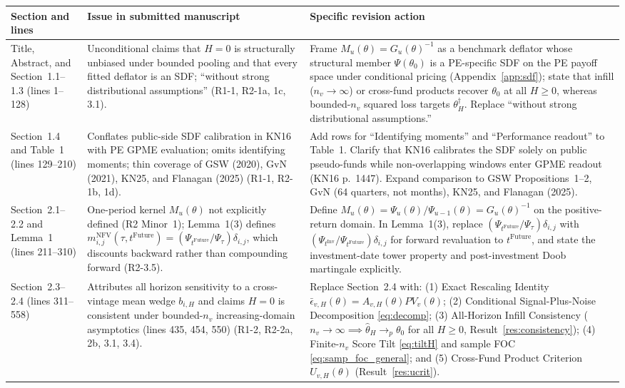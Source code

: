 \documentclass[11pt]{article}
\theoremstyle{plain}
\theoremstyle{definition}
\begin{document}
{\small
\begin{longtable}{@{}L{3.5cm}L{4.8cm}L{7.0cm}@{}}
\toprule
Section and lines & Issue in submitted manuscript & Specific revision action\\
\midrule
\endhead
Title, Abstract, and Section~1.1--1.3 (lines 1--128) & Unconditional claims that $H=0$ is structurally unbiased under bounded pooling and that every fitted deflator is an SDF; ``without strong distributional assumptions'' (R1-1, R2-1a, 1c, 3.1). & Frame $M_u(\theta)=G_u(\theta)^{-1}$ as a benchmark deflator whose structural member $\Psi(\theta_0)$ is a PE-specific SDF on the PE payoff space under conditional pricing (Appendix~\ref{app:sdf}); state that infill ($n_v\to\infty$) or cross-fund products recover $\theta_0$ at all $H\ge 0$, whereas bounded-$n_v$ squared loss targets $\theta_H^\dagger$. Replace ``without strong distributional assumptions.''\\
Section~1.4 and Table~1 (lines 129--210) & Conflates public-side SDF calibration in KN16 with PE GPME evaluation; omits identifying moments; thin coverage of GSW (2020), GvN (2021), KN25, and Flanagan (2025) (R1-1, R2-1b, 1d). & Add rows for ``Identifying moments'' and ``Performance readout'' to Table~1. Clarify that KN16 calibrates the SDF solely on public pseudo-funds while non-overlapping windows enter GPME readout (KN16 p.~1447). Expand comparison to GSW Propositions~1--2, GvN (64 quarters, not months), KN25, and Flanagan (2025).\\
Section~2.1--2.2 and Lemma~1 (lines 211--310) & One-period kernel $M_u(\theta)$ not explicitly defined (R2 Minor~1); Lemma~1(3) defines $m_{i,j}^{\mathrm{NFV}}(\tau,t^{\mathrm{Future}})=(\Psi_{t^{\mathrm{Future}}}/\Psi_\tau)\delta_{i,j}$, which discounts backward rather than compounding forward (R2-3.5). & Define $M_u(\theta)=\Psi_u(\theta)/\Psi_{u-1}(\theta)=G_u(\theta)^{-1}$ on the positive-return domain. In Lemma~1(3), replace $(\Psi_{t^{\mathrm{Future}}}/\Psi_\tau)\delta_{i,j}$ with $(\Psi_{t^{\mathrm{Inv}}}/\Psi_{t^{\mathrm{Future}}})\delta_{i,j}$ for forward revaluation to $t^{\mathrm{Future}}$, and state the investment-date tower property and post-investment Doob martingale explicitly.\\
Section~2.3--2.4 (lines 311--558) & Attributes all horizon sensitivity to a cross-vintage mean wedge $b_{i,H}$ and claims $H=0$ is consistent under bounded-$n_v$ increasing-domain asymptotics (lines 435, 454, 550) (R1-2, R2-2a, 2b, 3.1, 3.4). & Replace Section~2.4 with: (1) Exact Rescaling Identity $\bar\epsilon_{v,H}(\theta)=A_{v,H}(\theta)PV_v(\theta)$; (2) Conditional Signal-Plus-Noise Decomposition \eqref{eq:decomp}; (3) All-Horizon Infill Consistency ($n_v\to\infty\implies\hat\theta_H\to_p\theta_0$ for all $H\ge 0$, Result~\ref{res:consistency}); (4) Finite-$n_v$ Score Tilt \eqref{eq:tiltH} and sample FOC \eqref{eq:samp_foc_general}; and (5) Cross-Fund Product Criterion $U_{v,H}(\theta)$ (Result~\ref{res:ucrit}).\\

\end{longtable}}
\end{document}
